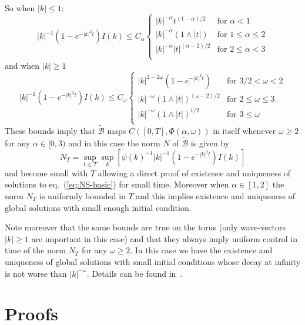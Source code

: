 \documentclass[a4paper,12pt,reqno]{amsart}
\newcommand{\1}{{\bf 1}}
\begin{document}
So when $|k|
\le 1$:
\begin{equation*}
|k|^{-1} (1-e^{-|k|^2 t}) I(k) \le C_\alpha \begin{cases}
 |k|^{-\alpha} t^{(1-\alpha)/2} & \text{for $\alpha < 1$}\\
 |k|^{-\alpha} (1 \wedge |t|) & \text{for $1 \le \alpha \le 2$}\\
 |k|^{-\alpha} |t|^{(\alpha-2)/2} & \text{for $2 \le \alpha < 3$}\\
\end{cases}  
\end{equation*}
and when $|k| \ge 1$
\begin{equation*}
|k|^{-1} (1-e^{-|k|^2 t}) I(k) \le C_\omega \begin{cases}
 |k|^{2-2\omega} (1-e^{-|k|^2 t}) & \text{for $3/2 < \omega < 2$}\\
 |k|^{-\omega} (1 \wedge |t|)^{(\omega-2)/2} & \text{for $2 \le \omega \le 3$}\\
 |k|^{-\omega} (1 \wedge |t|)^{1/2} & \text{for $3 \le \omega$}\\
\end{cases}  
\end{equation*}
These bounds imply that $\widetilde{\mathcal{B}}$ maps
$C([0,T],\Phi(\alpha,\omega))$ in itself whenever $\omega \ge 2$ for
any $\alpha \in [0,3)$ and in this case the norm $N$ of $\widetilde{\mathcal{B}}$ is given
by $$N_T = \sup_{t \le T} \sup_k [\psi(k)^{-1} |k|^{-1} (1-e^{-|k|^2
t}) I(k)]$$ and become  small
with $T$ allowing a direct proof of existence and uniqueness of
solutions to eq.~(\ref{eq:NS-basic}) for small time. Moreover when
$\alpha \in [1,2]$ the norm $N_T$ is
uniformly bounded in $T$ and this implies existence and uniqueness of
global solutions with small enough initial condition. 

Note moreover that the same bounds are true on the torus (only wave-vectors $|k| \ge 1$ are important in this case) and that they always imply
uniform control in time of the norm $N_T$ for any $\omega \ge 2$. 
In this case we have the existence and uniqueness of global solutions with
small initial conditions whose decay at infinity is not worse than $|k|^{-\omega}$.
Details can be found in~\cite{Sinai1}.

\section{Proofs}
\label{sec:proofs}
\end{document}
